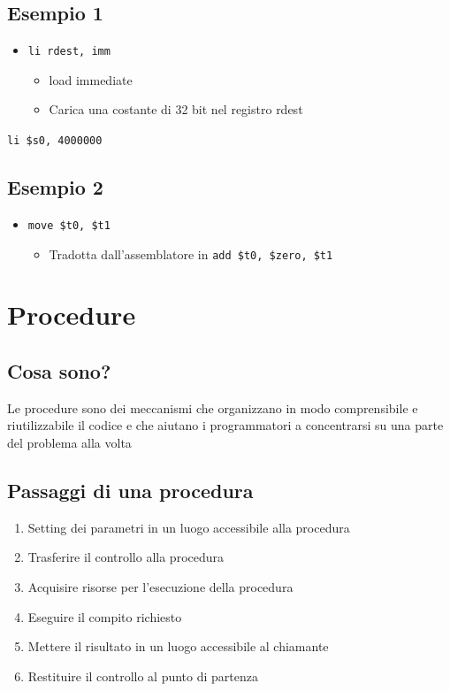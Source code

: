 \subsection{Esempio 1}
\begin{itemize}
    \item \texttt{li rdest, imm}
    \begin{itemize}
        \item load immediate
        \item Carica una costante di 32 bit nel registro rdest
    \end{itemize}
\end{itemize}
\begin{center}
    \texttt{li \$s0, 4000000}
\end{center}

\subsection{Esempio 2}
\begin{itemize}
    \item \texttt{move \$t0, \$t1}
    \begin{itemize}
        \item Tradotta dall'assemblatore in \texttt{add \$t0, \$zero, \$t1}
    \end{itemize}
\end{itemize}

\newpage
\section{Procedure}
\subsection{Cosa sono?}
Le procedure sono dei meccanismi che organizzano in modo comprensibile e riutilizzabile il codice e che aiutano i programmatori a concentrarsi su una parte del problema alla volta

\subsection{Passaggi di una procedura}
\begin{enumerate}
    \item Setting dei parametri in un luogo accessibile alla procedura
    \item Trasferire il controllo alla procedura
    \item Acquisire risorse per l'esecuzione della procedura
    \item Eseguire il compito richiesto
    \item Mettere il risultato in un luogo accessibile al chiamante
    \item Restituire il controllo al punto di partenza
\end{enumerate}

